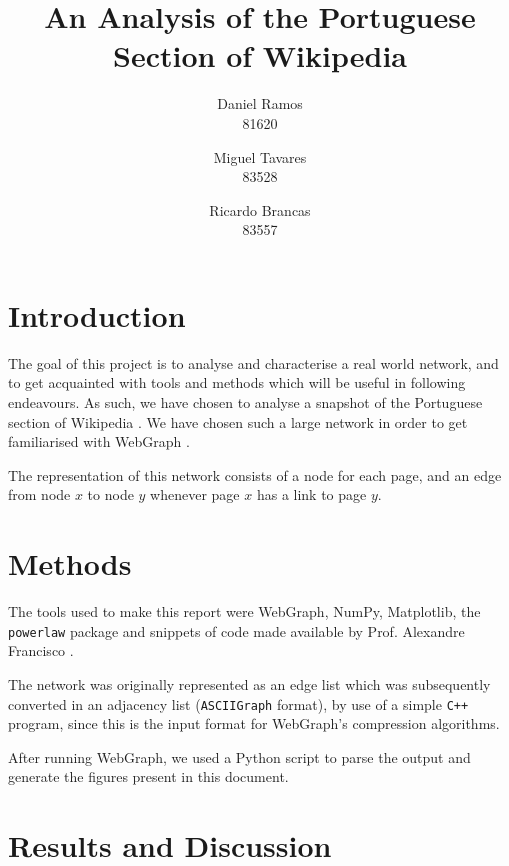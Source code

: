 \documentclass[9pt,a4paper,twocolumn,notitlepage]{article}
\title{An Analysis of the Portuguese Section of Wikipedia}
\author{Daniel Ramos \\ 81620 \and Miguel Tavares \\ 83528 \and Ricardo Brancas \\ 83557}
\begin{document}

\section{Introduction}
The goal of this project is to analyse and characterise a real world network, and to  get acquainted with tools and methods which will be useful in following endeavours.
As such, we have chosen to analyse a snapshot of the Portuguese section of Wikipedia \cite{dataset}.
We have chosen such a large network in order to get familiarised with WebGraph \cite{webgraph}.

The representation of this network consists of a node for each page, and an edge from node $x$ to node $y$ whenever page $x$ has a link to page $y$.

\section{Methods}
The tools used to make this report were WebGraph\cite{webgraph}, NumPy, Matplotlib, the \texttt{powerlaw} package\cite{alstott_bullmore_plenz_2014} and snippets of code made available
by Prof. Alexandre Francisco \cite{aplf}.

The network was originally represented as an edge list which was subsequently converted in an adjacency list (\texttt{ASCIIGraph} format), by use of a simple \texttt{C++} program, since this is the input
format for WebGraph's compression algorithms.

After running WebGraph, we used a Python script to parse the output and generate the figures present in this document.

\section{Results and Discussion}
\end{document}

